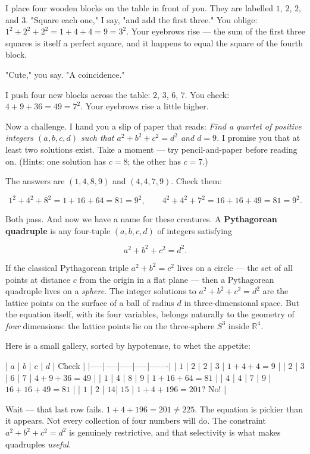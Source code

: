 \documentclass[11pt,twoside,openright]{book}
\theoremstyle{definition}
\theoremstyle{remark}
\begin{document}
I place four wooden blocks on the table in front of you. They are labelled $1$, $2$, $2$, and $3$. "Square each one," I say, "and add the first three." You oblige: $1^2 + 2^2 + 2^2 = 1 + 4 + 4 = 9 = 3^2$. Your eyebrows rise --- the sum of the first three squares is itself a perfect square, and it happens to equal the square of the fourth block.

"Cute," you say. "A coincidence."

I push four new blocks across the table: $2$, $3$, $6$, $7$. You check: $4 + 9 + 36 = 49 = 7^2$. Your eyebrows rise a little higher.

Now a challenge. I hand you a slip of paper that reads: \textit{Find a quartet of positive integers $(a, b, c, d)$ such that $a^2 + b^2 + c^2 = d^2$ and $d = 9$.} I promise you that at least two solutions exist. Take a moment --- try pencil-and-paper before reading on. (Hints: one solution has $c = 8$; the other has $c = 7$.)

The answers are $(1, 4, 8, 9)$ and $(4, 4, 7, 9)$. Check them:

\[1^2 + 4^2 + 8^2 = 1 + 16 + 64 = 81 = 9^2, \qquad 4^2 + 4^2 + 7^2 = 16 + 16 + 49 = 81 = 9^2.\]

Both pass. And now we have a name for these creatures. A \textbf{Pythagorean quadruple} is any four-tuple $(a, b, c, d)$ of integers satisfying

\[a^2 + b^2 + c^2 = d^2.\]

If the classical Pythagorean triple $a^2 + b^2 = c^2$ lives on a circle --- the set of all points at distance $c$ from the origin in a flat plane --- then a Pythagorean quadruple lives on a \textit{sphere}. The integer solutions to $a^2 + b^2 + c^2 = d^2$ are the lattice points on the surface of a ball of radius $d$ in three-dimensional space. But the equation itself, with its four variables, belongs naturally to the geometry of \textit{four} dimensions: the lattice points lie on the three-sphere $S^3$ inside $\mathbb{R}^4$.

Here is a small gallery, sorted by hypotenuse, to whet the appetite:

| $a$ | $b$ | $c$ | $d$ | Check |
|-----|-----|-----|-----|-------|
| $1$ | $2$ | $2$ | $3$ | $1+4+4=9$ |
| $2$ | $3$ | $6$ | $7$ | $4+9+36=49$ |
| $1$ | 4   | $8$ | $9$ | $1+16+64=81$ |
| $4$ | $4$ | $7$ | $9$ | $16+16+49=81$ |
| $1$ | $2$ | $14$| $\!15\!$ | $1+4+196=201$? No! |

Wait --- that last row fails. $1 + 4 + 196 = 201 \neq 225$. The equation is pickier than it appears. Not every collection of four numbers will do. The constraint $a^2 + b^2 + c^2 = d^2$ is genuinely restrictive, and that selectivity is what makes quadruples \textit{useful}.
\end{document}
